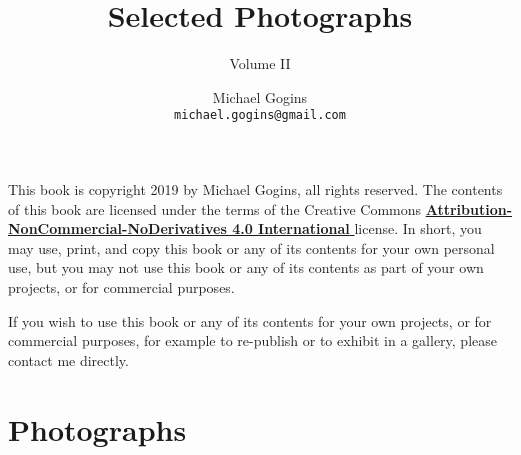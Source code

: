 

\frontmatter
\title{Selected Photographs}
\author{Michael Gogins \\ \texttt{michael.gogins@gmail.com}}
\subtitle{Volume II}
\dedication{This book is for Mick.}
\newpage
\noindent This book is copyright 2019 by Michael Gogins, all rights reserved. The contents of this book are licensed under the terms of the Creative Commons \href{https://creativecommons.org/licenses/by-nc-nd/4.0/legalcode}{\textbf{Attribution-NonCommercial-NoDerivatives 4.0 International} } license. In short, you may use, print, and copy this book or any of its contents for your own personal use, but you may not use this book or any of its contents as part of your own projects, or for commercial purposes.

If you wish to use this book or any of its contents for your own projects, or for commercial purposes, for example to re-publish or to exhibit in a gallery, please contact me directly.
\maketitle

\tableofcontents
{
	\setlength{}
	\begin{flushleft}
	\listoffigures
	\end{flushleft}
}

\mainmatter
{}

\chapter{Photographs}



